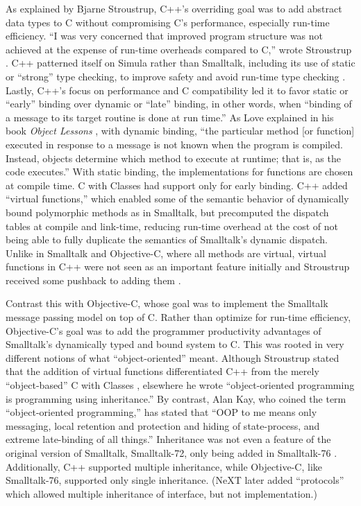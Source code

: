 \documentclass[acmsmall,screen]{acmart}
\begin{document}
As explained by Bjarne Stroustrup, C++'s overriding goal was to add abstract data types to C without compromising C's performance, especially run-time efficiency. ``I was very concerned that improved program structure was not achieved at the expense of run-time overheads compared to C,'' wrote Stroustrup \citetext{\citeyear[5]{stroustrup_history_1993}}. C++ patterned itself on Simula rather than Smalltalk, including its use of static or ``strong'' type checking, to improve safety and avoid run-time type checking \citep[30--31]{stroustrup_history_1993}. Lastly, C++'s focus on performance and C compatibility led it to favor static or ``early'' binding over dynamic or ``late'' binding, in other words, when ``binding of a message to its target routine is done at run time.'' \citep[15]{cox_object_1983} As Love explained in his book \emph{Object Lessons} \citep[29]{love_object_1995}, with dynamic binding, ``the particular method [or function] executed in response to a message is not known when the program is compiled. Instead, objects determine which method to execute at runtime; that is, as the code executes.'' With static binding, the implementations for functions are chosen at compile time. C with Classes had support only for early binding. C++ added ``virtual functions,'' which enabled some of the semantic behavior of dynamically bound polymorphic methods as in Smalltalk, but precomputed the dispatch tables at compile and link-time, reducing run-time overhead at the cost of not being able to fully duplicate the semantics of Smalltalk's dynamic dispatch. Unlike in Smalltalk and Objective-C, where all methods are virtual, virtual functions in C++ were not seen as an important feature initially and Stroustrup received some pushback to adding them  \citep[23]{stroustrup_history_1993}.

Contrast this with Objective-C, whose goal was to implement the Smalltalk message passing model on top of C. Rather than optimize for run-time efficiency, Objective-C's goal was to add the programmer productivity advantages of Smalltalk's dynamically typed and bound system to C. This was rooted in very different notions of what ``object-oriented'' meant. Although Stroustrup stated that the addition of virtual functions differentiated C++ from the merely ``object-based'' C with Classes \citep[22]{stroustrup_history_1993}, elsewhere he wrote ``object-oriented programming is programming using inheritance.'' \citep[30]{stroustrup_history_1993} By contrast, Alan Kay, who coined the term ``object-oriented programming,'' has stated that ``OOP to me means only messaging, local retention and protection and hiding of state-process, and extreme late-binding of all things.''  Inheritance was not even a feature of the original version of Smalltalk, Smalltalk-72, only being added in Smalltalk-76 \citep[84]{kay_early_1993}. Additionally, C++ supported multiple inheritance, while Objective-C, like Smalltalk-76, supported only single inheritance. (NeXT later added ``protocols'' which allowed multiple inheritance of interface, but not implementation.)
\end{document}
